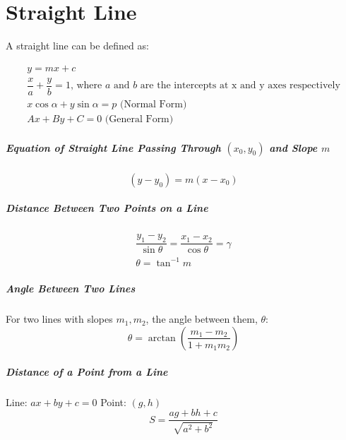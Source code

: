 \large{\chapter{Straight Line}}
A straight line can be defined as:

\begin{align}
	y=mx+c\\
	\dfrac{x}{a}+\dfrac{y}{b}=1\text{, where }a\text{ and }b\text{ are the intercepts at x and y axes respectively}\\
	x\cos\alpha + y\sin\alpha = p\text{ (Normal Form)}\\
	Ax+By+C=0\text{ (General Form)}
\end{align}

\paragraph{Equation of Straight Line Passing Through $(x_0,y_0)$ and Slope $m$\newline}
\begin{equation}
	(y-y_0)=m(x-x_0)
\end{equation}

\paragraph{Distance Between Two Points on a Line\newline}
\begin{align}
	\dfrac{y_1-y_2}{\sin\theta}=\dfrac{x_1-x_2}{\cos\theta}=\gamma\\
	\theta=\tan^{-1}m
\end{align}

\paragraph{Angle Between Two Lines\newline}
For two lines with slopes $m_1, m_2$, the angle between them, $\theta$:
\begin{equation}
	\theta=\arctan\left(\dfrac{m_1-m_2}{1+m_1m_2}\right)
\end{equation}

\paragraph{Distance of a Point from a Line\newline}
Line: $ax+by+c=0$
Point: $(g,h)$
\begin{equation}
	S=\dfrac{ag+bh+c}{\sqrt{a^2+b^2}}
\end{equation}

